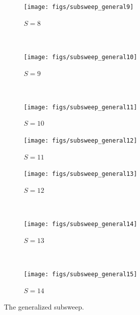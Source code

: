 \begin{figure}
    \begin{subfigure}[b]{0.2\textwidth}
        \texttt{[image: figs/subsweep\_general9]}
        \caption{$S=8$}
        \label{fig:subsweep_general9}
    \end{subfigure}
    ~ %
    \begin{subfigure}[b]{0.2\textwidth}
        \texttt{[image: figs/subsweep\_general10]}
        \caption{$S=9$}
        \label{fig:subsweep_general10}
    \end{subfigure}
    ~ %
    \begin{subfigure}[b]{0.2\textwidth}
        \texttt{[image: figs/subsweep\_general11]}
        \caption{$S=10$}
        \label{fig:subsweep_general11}
    \end{subfigure}
    \begin{subfigure}[b]{0.2\textwidth}
        \texttt{[image: figs/subsweep\_general12]}
        \caption{$S=11$}
        \label{fig:subsweep_general12}
    \end{subfigure}
    
    \begin{subfigure}[b]{0.2\textwidth}
        \texttt{[image: figs/subsweep\_general13]}
        \caption{$S=12$}
        \label{fig:subsweep_general13}
    \end{subfigure}
    ~ %
    \begin{subfigure}[b]{0.2\textwidth}
        \texttt{[image: figs/subsweep\_general14]}
        \caption{$S=13$}
        \label{fig:subsweep_general14}
    \end{subfigure}
    ~ %
    \begin{subfigure}[b]{0.2\textwidth}
        \texttt{[image: figs/subsweep\_general15]}
        \caption{$S=14$}
        \label{fig:subsweep_general15}
    \end{subfigure}
    \caption{The generalized subsweep.}\label{fig:subsweep_general}
\end{figure}

